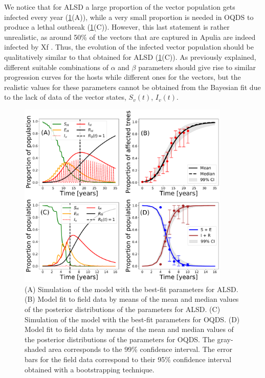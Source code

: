 We notice that for ALSD a large proportion of the vector population gets
infected every year (\cref{fig:best_fit_model}(A)), while a very small
proportion is needed in OQDS to produce a lethal outbreak
(\cref{fig:best_fit_model}(C)). However, this last statement is rather
unrealistic, as around 50\% of the vectors that are captured in Apulia are
indeed infected by Xf \cite{Cavalieri2019,cornara2017transmission}. Thus, the
evolution of the infected vector population should be qualitatively similar to
that obtained for ALSD (\cref{fig:best_fit_model}(C)). As previously explained,
different suitable combinations of $\alpha$ and $\beta$ parameters should give
rise to similar progression curves for the hosts while different ones for the
vectors, but the realistic values for these parameters cannot be obtained from
the Bayesian fit due to the lack of data of the vector states, $S_v(t)$,
$I_v(t)$.

\begin{figure}[H]
    \centering
    \includegraphics[width=0.9\textwidth]{Figures/BayesianInference.pdf}
    \caption{(A) Simulation of the model with the best-fit parameters for
        ALSD. (B) Model fit to field data by means of the mean and median
        values of the
        posterior distributions of the parameters for ALSD. (C) Simulation of
        the model
        with the best-fit parameters for OQDS. (D) Model fit to field data by
        means of
        the mean and median values of the posterior distributions of the
        parameters for
        OQDS. The gray-shaded area corresponds to the 99\% confidence interval.
        The
        error bars for the field data correspond to their 95\% confidence
        interval
        obtained with a bootstrapping technique.}
    \label{fig:best_fit_model}
\end{figure}

